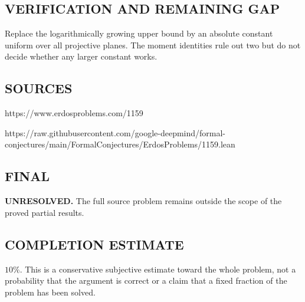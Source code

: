 \subsection*{VERIFICATION AND REMAINING GAP}
Replace the logarithmically growing upper bound by an absolute constant
uniform over all projective planes. The moment identities rule out two but
do not decide whether any larger constant works.

\subsection*{SOURCES}
https://www.erdosproblems.com/1159

https://raw.githubusercontent.com/google-deepmind/formal-conjectures/main/FormalConjectures/ErdosProblems/1159.lean

\subsection*{FINAL}
\textbf{UNRESOLVED.} The full source problem remains outside the scope of the proved partial results.

\subsection*{COMPLETION ESTIMATE}
$10\%$. This is a conservative subjective estimate toward the whole problem, not a probability that the argument is correct or a claim that a fixed fraction of the problem has been solved.
